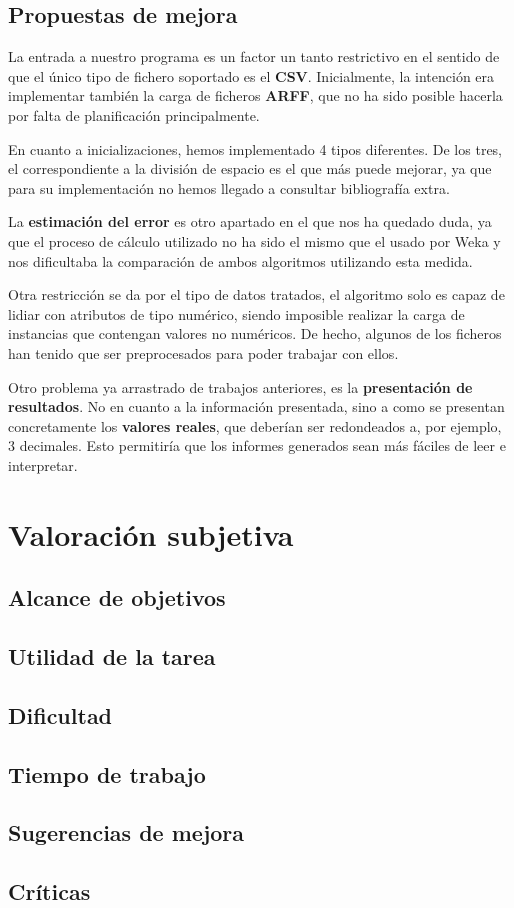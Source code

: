 \documentclass[a4paper]{report}
\begin{document}
	\section{Propuestas de mejora}
	
	La entrada a nuestro programa es un factor un tanto restrictivo en el sentido de que el único tipo de fichero soportado es el \textbf{CSV}. Inicialmente, la intención era implementar también la carga de ficheros \textbf{ARFF}, que no ha sido posible hacerla por falta de planificación principalmente.
	
	En cuanto a inicializaciones, hemos implementado 4 tipos diferentes. De los tres, el correspondiente a la división de espacio es el que más puede mejorar, ya que para su implementación no hemos llegado a consultar bibliografía extra.
	
	La \textbf{estimación del error} es otro apartado en el que nos ha quedado duda, ya que el proceso de cálculo utilizado no ha sido el mismo que el usado por Weka y nos dificultaba la comparación de ambos algoritmos utilizando esta medida.
	
	Otra restricción se da por el tipo de datos tratados, el algoritmo solo es capaz de lidiar con atributos de tipo numérico, siendo imposible realizar la carga de instancias que contengan valores no numéricos. De hecho, algunos de los ficheros han tenido que ser preprocesados para poder trabajar con ellos.
	
	Otro problema ya arrastrado de trabajos anteriores, es la \textbf{presentación de resultados}. No en cuanto a la información presentada, sino a como se presentan concretamente los\textbf{ valores reales}, que deberían ser redondeados a, por ejemplo, 3 decimales. Esto permitiría que los informes generados sean más fáciles de leer e interpretar.


\newpage




\newpage


\chapter{Valoración subjetiva}
	
	\section*{Alcance de objetivos}
	
	\section*{Utilidad de la tarea}
	
	\section*{Dificultad}
	
	\section*{Tiempo de trabajo}
	
	\section*{Sugerencias de mejora}
	
	\section*{Críticas}
\end{document}
